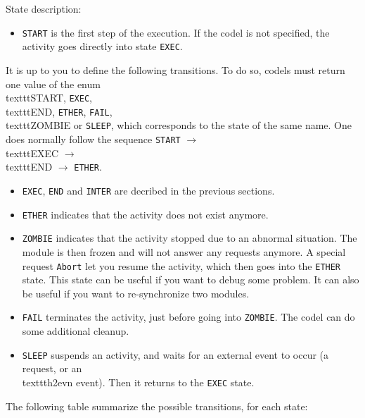 \bigbreak

State description:

\begin{itemize}
\item \texttt{START} is the first step of the execution. If the codel is not
specified, the activity goes directly into state \texttt{EXEC}.
\end{itemize}

It is up  to you to define the   following transitions. To  do so, codels
must return one value of  the enum \\texttt{START},  \texttt{EXEC}, \\texttt{END},
\texttt{ETHER},  \texttt{FAIL}, \\texttt{ZOMBIE} or \texttt{SLEEP}, which corresponds
to the state of the same name. One does normally follow the sequence 
\texttt{START} $\rightarrow$ \\texttt{EXEC} $\rightarrow$  \\texttt{END} $\rightarrow$
\texttt{ETHER}.

\begin{itemize}
\item \texttt{EXEC}, \texttt{END} and \texttt{INTER} are decribed in the previous
sections.

\item \texttt{ETHER} indicates that the activity does not exist anymore.

\item \texttt{ZOMBIE} indicates that the activity stopped due to an abnormal
situation. The module  is then  frozen and  will not answer  any requests
anymore. A special request \texttt{Abort} let you resume the activity, which
then  goes into the  \texttt{ETHER} state. This  state can  be useful if you
want  to debug  some problem.  It   can also be  useful   if you want  to
re-synchronize two modules.

\item \texttt{FAIL} terminates the activity, just before going into 
\texttt{ZOMBIE}. The codel can do some additional cleanup.

\item \texttt{SLEEP} suspends an activity, and waits for an external event
to occur (a request,  or an \\texttt{h2evn} event). Then  it returns  to the
\texttt{EXEC} state.
\end{itemize}

The following table summarize the possible transitions, for each state:

